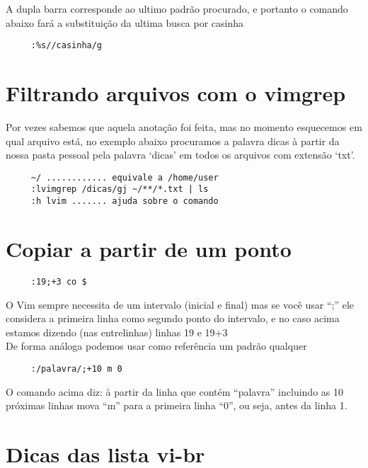A dupla barra corresponde ao ultimo padrão procurado, e portanto o
comando abaixo fará a substituição da ultima busca por casinha

\begin{verbatim}
     :%s//casinha/g
\end{verbatim}

\section{Filtrando arquivos com o vimgrep}
\label{Filtrando arquivos com o vimgrep}

Por vezes sabemos que aquela anotação foi feita, mas no momento esquecemos em qual
arquivo está, no exemplo abaixo procuramos a palavra dicas à partir da nossa pasta pessoal
pela palavra `dicas' em todos os arquivos com extensão `txt'.

\begin{verbatim}
     ~/ ............ equivale a /home/user
     :lvimgrep /dicas/gj ~/**/*.txt | ls
     :h lvim ....... ajuda sobre o comando
\end{verbatim}



\section{Copiar a partir de um ponto}

\begin{verbatim}
     :19;+3 co $
\end{verbatim}

O Vim sempre necessita de um intervalo (inicial e final) mas se você
usar ``;'' ele considera a primeira linha como segundo ponto do
intervalo, e no caso acima estamos dizendo (nas entrelinhas) linhas
19 e 19+3     \\


De forma análoga podemos usar como referência um padrão qualquer

\begin{verbatim}
     :/palavra/;+10 m 0
\end{verbatim}

O comando acima diz: à partir da linha que contém ``palavra'' incluindo as 10 próximas linhas
mova ``m'' para a primeira linha ``0'', ou seja, antes da linha 1.

\section{Dicas das lista vi-br}

